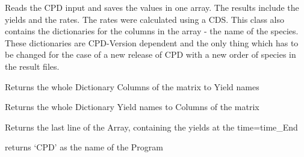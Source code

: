 \documentclass[letterpaper,10pt,english]{sphinxmanual}
\begin{document}
\begin{fulllineitems}
\label{CPDClasses:CPD_Result.CPD_Result}
Reads the CPD input and saves the values in one array. The results include the yields and the rates. The rates were calculated using a CDS. This class also contains the dictionaries for the columns in the array - the name of the species. These dictionaries are CPD-Version dependent and the only thing which has to be changed for the case of a new release of CPD with a new order of species in the result files.

\begin{fulllineitems}
\label{CPDClasses:CPD_Result.CPD_Result.DictCols2Yields}
Returns the whole Dictionary Columns of the matrix to Yield names

\end{fulllineitems}


\begin{fulllineitems}
\label{CPDClasses:CPD_Result.CPD_Result.DictYields2Cols}
Returns the whole Dictionary Yield names to Columns of the matrix

\end{fulllineitems}


\begin{fulllineitems}
\label{CPDClasses:CPD_Result.CPD_Result.FinalYields}
Returns the last line of the Array, containing the yields at the time=time\_End

\end{fulllineitems}


\begin{fulllineitems}
\label{CPDClasses:CPD_Result.CPD_Result.Name}
returns `CPD' as the name of the Program

\end{fulllineitems}



\end{fulllineitems}
\end{document}
